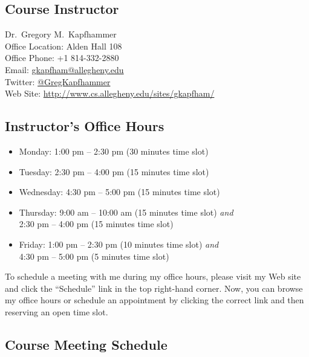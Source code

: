 

\usepackage[compact]{titlesec}



\subsection*{Course Instructor}
Dr.\ Gregory M.\ Kapfhammer\\
\noindent Office Location: Alden Hall 108 \\
\noindent Office Phone: +1 814-332-2880 \\
\noindent Email: \url{gkapfham@allegheny.edu} \\
\noindent Twitter: \url{@GregKapfhammer} \\
\noindent Web Site: \url{http://www.cs.allegheny.edu/sites/gkapfham/} 

\subsection*{Instructor's Office Hours}

\begin{itemize}
	\itemsep 0em
	\item Monday: 1:00 pm -- 2:30 pm (30 minutes time slot)
	\item Tuesday: 2:30 pm -- 4:00 pm (15 minutes time slot)
	\item Wednesday: 4:30 pm -- 5:00 pm (15 minutes time slot)
	\item Thursday: 9:00 am -- 10:00 am (15 minutes time slot) {\em and} \\ \hspace*{.69in} 2:30 pm -- 4:00 pm (15 minutes time slot)
	\item Friday: 1:00 pm -- 2:30 pm (10 minutes time slot) {\em and} \\ \hspace*{.49in} 4:30 pm -- 5:00 pm (5 minutes time slot)
\end{itemize}

\noindent
To schedule a meeting with me during my office hours, please visit my Web site and click the ``Schedule'' link in the
top right-hand corner. Now, you can browse my office hours or schedule an appointment by clicking the correct link and
then reserving an open time slot. 

\subsection*{Course Meeting Schedule}

